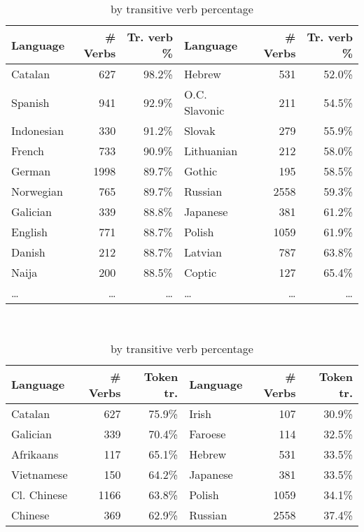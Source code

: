 \begin{table}[ht]
    \centering
    \small
    \begin{subtable}[c]{\textwidth}
      \centering
      \begin{tabular}{lrr|lrr}
        \toprule
        Language & \# Verbs & Tr. verb \% & Language & \# Verbs & Tr. verb \% \\
        \midrule
        Catalan & 627 & 98.2\% & Hebrew & 531 & 52.0\% \\
        Spanish & 941 & 92.9\% & O.C. Slavonic & 211 & 54.5\% \\
        Indonesian & 330 & 91.2\% & Slovak & 279 & 55.9\% \\
        French & 733 & 90.9\% & Lithuanian & 212 & 58.0\% \\
        German & 1998 & 89.7\% & Gothic & 195 & 58.5\% \\
        Norwegian & 765 & 89.7\% & Russian & 2558 & 59.3\% \\
        Galician & 339 & 88.8\% & Japanese & 381 & 61.2\% \\
        English & 771 & 88.7\% & Polish & 1059 & 61.9\% \\
        Danish & 212 & 88.7\% & Latvian & 787 & 63.8\% \\
        Naija & 200 & 88.5\% & Coptic & 127 & 65.4\% \\
        \dots & \dots & \dots & \dots & \dots & \dots \\
        \bottomrule
      \end{tabular}
      \caption{by transitive verb percentage}
      \label{tab:most_tr_by_verb_percentage}
    \end{subtable}\\
    \begin{subtable}[c]{\textwidth}
      \centering
      \begin{tabular}{lrr|lrr}
        \toprule
        Language & \# Verbs & Token tr. & Language & \# Verbs & Token tr. \\
        \midrule
        Catalan & 627 & 75.9\% & Irish & 107 & 30.9\% \\
        Galician & 339 & 70.4\% & Faroese & 114 & 32.5\% \\
        Afrikaans & 117 & 65.1\% & Hebrew & 531 & 33.5\% \\
        Vietnamese & 150 & 64.2\% & Japanese & 381 & 33.5\% \\
        Cl. Chinese & 1166 & 63.8\% & Polish & 1059 & 34.1\% \\
        Chinese & 369 & 62.9\% & Russian & 2558 & 37.4\% \\

\end{tabular}
\end{subtable}
\end{table}
